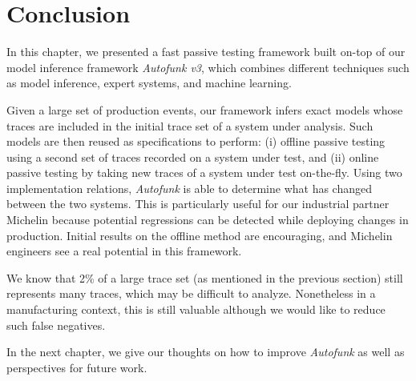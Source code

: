\section{Conclusion}
\label{sec:testing:conclusion}

In this chapter, we presented a fast passive testing framework
built on-top of our model inference framework \emph{Autofunk v3},
which combines different techniques such as model inference,
expert systems, and machine learning.

Given a large set of production events, our framework infers
exact models whose traces are included \cite{petrenko06} in the
initial trace set of a system under analysis. Such models are
then reused as specifications to perform: (i) offline passive
testing using a second set of traces recorded on a system under
test, and (ii) online passive testing by taking new traces of a
system under test on-the-fly. Using two implementation relations,
\textit{Autofunk} is able to determine what has changed between
the two systems. This is particularly useful for our industrial
partner Michelin because potential regressions can be detected
while deploying changes in production. Initial results on the
offline method are encouraging, and Michelin engineers see a real
potential in this framework.

We know that 2\% of a large trace set (as mentioned in the
previous section) still represents many traces, which may be
difficult to analyze. Nonetheless in a manufacturing context,
this is still valuable although we would like to reduce such
false negatives.

In the next chapter, we give our thoughts on how to improve
\textit{Autofunk} as well as perspectives for future work.
